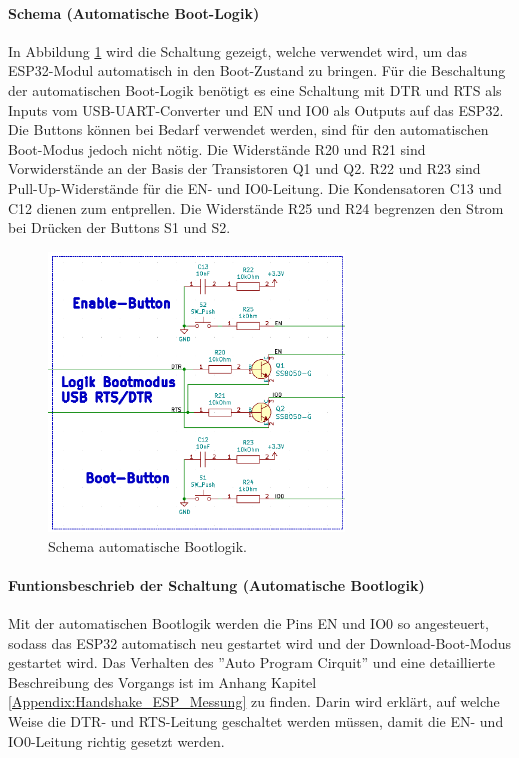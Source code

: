 \paragraph{Schema (Automatische Boot-Logik)}\mbox{}

In Abbildung \ref{fig:Schema_ESP32_Flashbuttons} wird die Schaltung gezeigt, welche verwendet wird, um das ESP32-Modul automatisch in den Boot-Zustand zu bringen. Für die Beschaltung der automatischen Boot-Logik benötigt es eine Schaltung mit DTR und RTS als Inputs vom USB-UART-Converter und EN und IO0 als Outputs auf das ESP32. Die Buttons können bei Bedarf verwendet werden, sind für den automatischen Boot-Modus jedoch nicht nötig.
Die Widerstände R20 und R21 sind Vorwiderstände an der Basis der Transistoren Q1 und Q2. R22 und R23 sind Pull-Up-Widerstände für die EN- und IO0-Leitung. Die Kondensatoren C13 und C12 dienen zum entprellen. Die Widerstände R25 und R24 begrenzen den Strom bei Drücken der Buttons S1 und S2.

\begin{figure}[H]
	\centering
	\includegraphics[width=0.7\textwidth]{graphics/Schema_ESP32_Flashbuttons}
	\caption{Schema automatische Bootlogik.}
	\label{fig:Schema_ESP32_Flashbuttons}
\end{figure}
\paragraph{Funtionsbeschrieb der Schaltung (Automatische Bootlogik)}\mbox{}

Mit der automatischen Bootlogik werden die Pins EN und IO0 so angesteuert, sodass das ESP32 automatisch neu gestartet wird und der Download-Boot-Modus gestartet wird. Das Verhalten des ''Auto Program Cirquit'' und eine detaillierte Beschreibung des Vorgangs ist im Anhang Kapitel \ref{Appendix:Handshake_ESP_Messung} zu finden. Darin wird erklärt, auf welche Weise die DTR- und RTS-Leitung geschaltet werden müssen, damit die EN- und IO0-Leitung richtig gesetzt werden.
